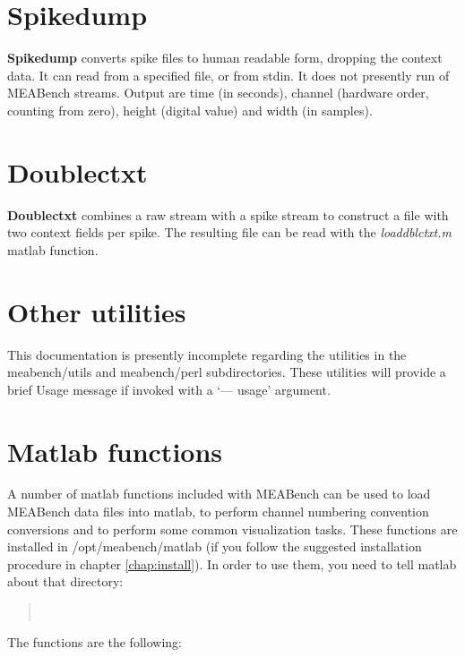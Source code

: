 \documentclass[12pt,oneside]{book}
\def\meabench{{MEABench}\xspace}
\def\prog#1{{\bf #1}}
\def\streamtype#1{{\sc #1}\xspace}
\def\raw{\streamtype{raw}}
\def\spike{\streamtype{spike}}
\def\filename#1{{\sf #1}\xspace}
\begin{document}
\section{Spikedump}

\prog{Spikedump} converts \spike files to human readable form,
dropping the context data. It can read from a specified file, or
from stdin. It does not presently run of \meabench streams. Output are
time (in seconds), channel (hardware order, counting from zero),
height (digital value) and width (in samples).

\section{Doublectxt}

\prog{Doublectxt} combines a \raw stream with a \spike stream to
construct a file with two context fields per spike.
The resulting file can be read with
the \emph{loaddblctxt.m} matlab function.

\section{Other utilities}

This documentation is presently incomplete regarding the utilities in
the \filename{meabench/utils} and \filename{meabench/perl}
subdirectories. These utilities will provide a brief Usage message if
invoked with a `--\kern2pt--\kern2pt usage' argument.

\section{Matlab functions}

A number of matlab functions included with \meabench can be used to
load \meabench data files into matlab, to perform channel numbering
convention conversions and to perform some common visualization tasks.
These functions are installed in /opt/meabench/matlab (if you follow
the suggested installation procedure in chapter \ref{chap:install}).
In order to use them, you need to tell matlab about that directory:
\begin{quotation}
\Prompt{$>\kern-2pt>$}~
\end{quotation}

The functions are the following:

\begin{itemize}

\end{itemize}
\end{document}
